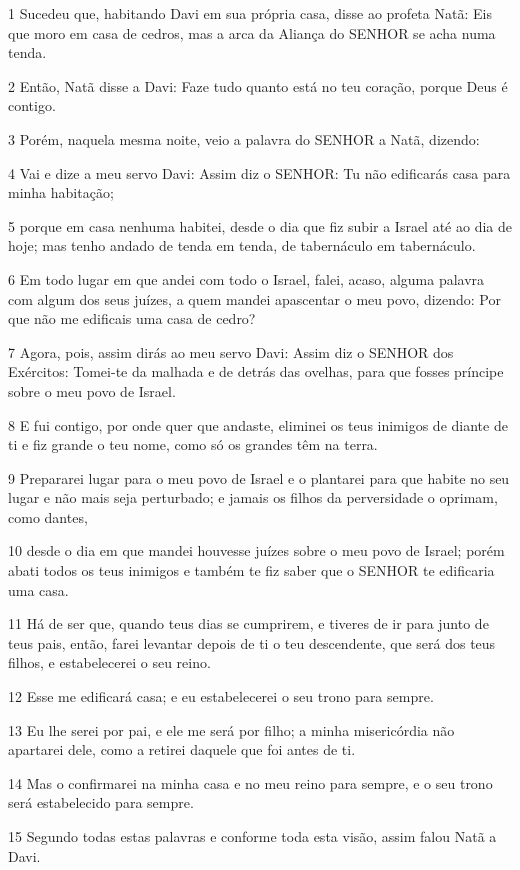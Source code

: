 \par 1 Sucedeu que, habitando Davi em sua própria casa, disse ao profeta Natã: Eis que moro em casa de cedros, mas a arca da Aliança do SENHOR se acha numa tenda.
\par 2 Então, Natã disse a Davi: Faze tudo quanto está no teu coração, porque Deus é contigo.
\par 3 Porém, naquela mesma noite, veio a palavra do SENHOR a Natã, dizendo:
\par 4 Vai e dize a meu servo Davi: Assim diz o SENHOR: Tu não edificarás casa para minha habitação;
\par 5 porque em casa nenhuma habitei, desde o dia que fiz subir a Israel até ao dia de hoje; mas tenho andado de tenda em tenda, de tabernáculo em tabernáculo.
\par 6 Em todo lugar em que andei com todo o Israel, falei, acaso, alguma palavra com algum dos seus juízes, a quem mandei apascentar o meu povo, dizendo: Por que não me edificais uma casa de cedro?
\par 7 Agora, pois, assim dirás ao meu servo Davi: Assim diz o SENHOR dos Exércitos: Tomei-te da malhada e de detrás das ovelhas, para que fosses príncipe sobre o meu povo de Israel.
\par 8 E fui contigo, por onde quer que andaste, eliminei os teus inimigos de diante de ti e fiz grande o teu nome, como só os grandes têm na terra.
\par 9 Prepararei lugar para o meu povo de Israel e o plantarei para que habite no seu lugar e não mais seja perturbado; e jamais os filhos da perversidade o oprimam, como dantes,
\par 10 desde o dia em que mandei houvesse juízes sobre o meu povo de Israel; porém abati todos os teus inimigos e também te fiz saber que o SENHOR te edificaria uma casa.
\par 11 Há de ser que, quando teus dias se cumprirem, e tiveres de ir para junto de teus pais, então, farei levantar depois de ti o teu descendente, que será dos teus filhos, e estabelecerei o seu reino.
\par 12 Esse me edificará casa; e eu estabelecerei o seu trono para sempre.
\par 13 Eu lhe serei por pai, e ele me será por filho; a minha misericórdia não apartarei dele, como a retirei daquele que foi antes de ti.
\par 14 Mas o confirmarei na minha casa e no meu reino para sempre, e o seu trono será estabelecido para sempre.
\par 15 Segundo todas estas palavras e conforme toda esta visão, assim falou Natã a Davi.
